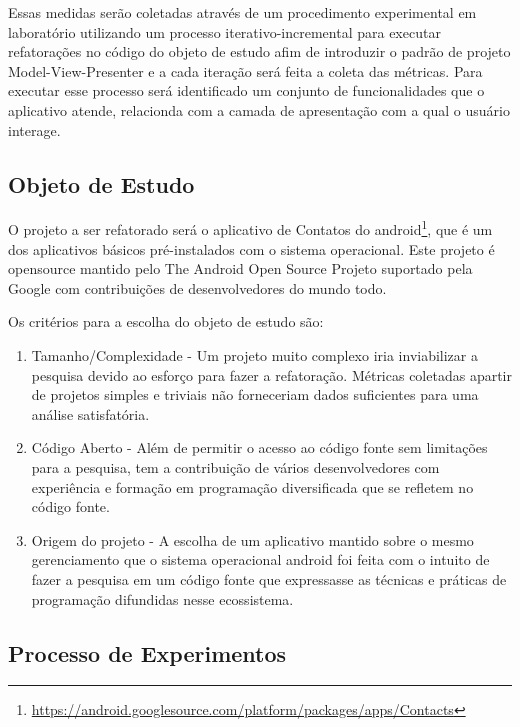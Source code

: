 Essas medidas serão coletadas através de um procedimento experimental em
laboratório utilizando um processo iterativo-incremental para executar
refatorações no código do objeto de estudo afim de introduzir o padrão de
projeto Model-View-Presenter e a cada iteração será feita a coleta das
métricas. Para executar esse processo será identificado um conjunto de
funcionalidades que o aplicativo atende, relacionda com a camada de
apresentação com a qual o usuário interage.

\subsection{Objeto de Estudo}


O projeto a ser refatorado será o aplicativo de Contatos do
android\footnote{\url{https://android.googlesource.com/platform/packages/apps/Contacts}},
que é um dos aplicativos básicos pré-instalados com o sistema operacional. Este
projeto é opensource mantido pelo  The Android Open Source Projeto suportado
pela Google com contribuições de desenvolvedores do mundo todo.

Os critérios para a escolha do objeto de estudo são:

\begin{enumerate}
  \item Tamanho/Complexidade - Um projeto muito complexo iria inviabilizar a
  pesquisa devido ao esforço para fazer a refatoração. Métricas coletadas
  apartir de projetos simples e triviais não forneceriam dados suficientes para
  uma análise satisfatória.
  \item Código Aberto - Além de permitir o acesso ao código fonte sem
  limitações para a pesquisa, tem a contribuição de vários desenvolvedores com
  experiência e formação em programação diversificada que se refletem no código fonte.
  \item Origem do projeto - A escolha de um aplicativo mantido sobre o mesmo
  gerenciamento que o sistema operacional android foi feita com o intuito de
  fazer a pesquisa em um código fonte que expressasse as técnicas e práticas de
  programação difundidas nesse ecossistema.
\end{enumerate}

\subsection{Processo de Experimentos}


